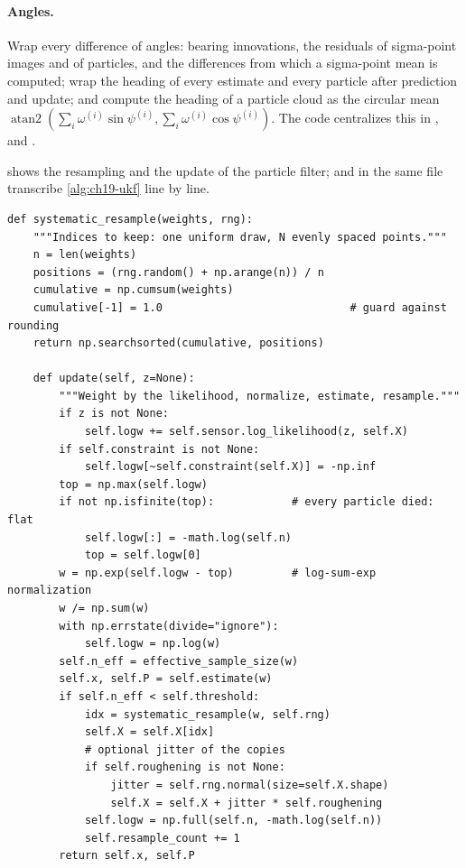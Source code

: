 \paragraph{Angles.}
Wrap every difference of angles: bearing innovations, the residuals of
sigma-point images and of particles, and the differences from which a
sigma-point mean is computed; wrap the heading of every estimate and every
particle after prediction and update; and compute the heading of a particle
cloud as the circular mean $\operatorname{atan2}(\sum_i
\omega^{(i)}\sin\psi^{(i)}, \sum_i \omega^{(i)}\cos\psi^{(i)})$. The code centralizes
this in ,  and .

 shows the resampling and the update of the particle
filter;  and  in the same
file transcribe \cref{alg:ch19-ukf} line by line.

\begin{lstlisting}[caption={Systematic resampling and the update of the bootstrap particle filter with log-weights (from \code{code/ch19\_nonlinear\_filters.py}).},label={lst:ch19-pf}]
def systematic_resample(weights, rng):
    """Indices to keep: one uniform draw, N evenly spaced points."""
    n = len(weights)
    positions = (rng.random() + np.arange(n)) / n
    cumulative = np.cumsum(weights)
    cumulative[-1] = 1.0                             # guard against rounding
    return np.searchsorted(cumulative, positions)

    def update(self, z=None):
        """Weight by the likelihood, normalize, estimate, resample."""
        if z is not None:
            self.logw += self.sensor.log_likelihood(z, self.X)
        if self.constraint is not None:
            self.logw[~self.constraint(self.X)] = -np.inf
        top = np.max(self.logw)
        if not np.isfinite(top):            # every particle died: flat
            self.logw[:] = -math.log(self.n)
            top = self.logw[0]
        w = np.exp(self.logw - top)         # log-sum-exp normalization
        w /= np.sum(w)
        with np.errstate(divide="ignore"):
            self.logw = np.log(w)
        self.n_eff = effective_sample_size(w)
        self.x, self.P = self.estimate(w)
        if self.n_eff < self.threshold:
            idx = systematic_resample(w, self.rng)
            self.X = self.X[idx]
            # optional jitter of the copies
            if self.roughening is not None:
                jitter = self.rng.normal(size=self.X.shape)
                self.X = self.X + jitter * self.roughening
            self.logw = np.full(self.n, -math.log(self.n))
            self.resample_count += 1
        return self.x, self.P
\end{lstlisting}


